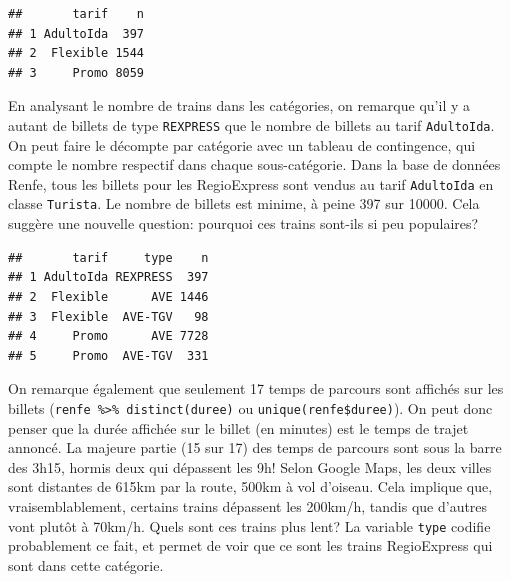 \documentclass[
  11pt,
  letterpaper,
]{article}
\newenvironment{Shaded}{\begin{snugshade}}{\end{snugshade}}
\newcommand{\DecValTok}[1]{\textcolor[rgb]{0.00,0.00,0.81}{#1}}
\newcommand{\KeywordTok}[1]{\textcolor[rgb]{0.13,0.29,0.53}{\textbf{#1}}}
\newcommand{\NormalTok}[1]{#1}
\newcommand{\OperatorTok}[1]{\textcolor[rgb]{0.81,0.36,0.00}{\textbf{#1}}}
\newcommand{\StringTok}[1]{\textcolor[rgb]{0.31,0.60,0.02}{#1}}
\theoremstyle{definition}
\theoremstyle{definition}
\theoremstyle{definition}
\theoremstyle{remark}
\begin{document}
\begin{verbatim}
##       tarif    n
## 1 AdultoIda  397
## 2  Flexible 1544
## 3     Promo 8059
\end{verbatim}

En analysant le nombre de trains dans les catégories, on remarque qu'il y a autant de billets de type \texttt{REXPRESS} que le nombre de billets au tarif \texttt{AdultoIda}. On peut faire le décompte par catégorie avec un tableau de contingence, qui compte le nombre respectif dans chaque sous-catégorie. Dans la base de données Renfe, tous les billets pour les RegioExpress sont vendus au tarif \texttt{AdultoIda} en classe \texttt{Turista}. Le nombre de billets est minime, à peine 397 sur 10000. Cela suggère une nouvelle question: pourquoi ces trains sont-ils si peu populaires?

\begin{verbatim}
##       tarif     type    n
## 1 AdultoIda REXPRESS  397
## 2  Flexible      AVE 1446
## 3  Flexible  AVE-TGV   98
## 4     Promo      AVE 7728
## 5     Promo  AVE-TGV  331
\end{verbatim}

On remarque également que seulement 17 temps de parcours sont affichés sur les billets (\texttt{renfe\ \%\textgreater{}\%\ distinct(duree)} ou \texttt{unique(renfe\$duree)}). On peut donc penser que la durée affichée sur le billet (en minutes) est le temps de trajet annoncé. La majeure partie (15 sur 17) des temps de parcours sont sous la barre des 3h15, hormis deux qui dépassent les 9h! Selon Google Maps, les deux villes sont distantes de 615km par la route, 500km à vol d'oiseau. Cela implique que, vraisemblablement, certains trains dépassent les 200km/h, tandis que d'autres vont plutôt à 70km/h. Quels sont ces trains plus lent? La variable \texttt{type} codifie probablement ce fait, et permet de voir que ce sont les trains RegioExpress qui sont dans cette catégorie.

\begin{Shaded}
\end{Shaded}
\end{document}
